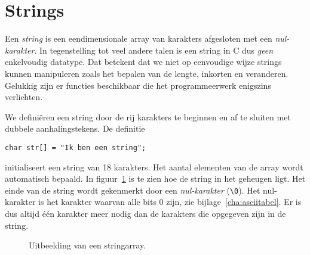 

\section{Strings}
Een \textsl{string} is een eendimensionale array van karakters afgesloten met een \textsl{nul-karakter}. In tegenstelling tot veel andere talen is een string in C dus \textsl{geen} enkelvoudig datatype. Dat betekent dat we niet op eenvoudige wijze strings kunnen manipuleren zoals het bepalen van de lengte, inkorten en veranderen. Gelukkig zijn er functies beschikbaar die het programmeerwerk enigszins verlichten. 

We definiëren een string door de rij karakters te beginnen en af te sluiten met dubbele aanhalingstekens. De definitie

\begin{lstlisting}[style=lstoneline]
char str[] = "Ik ben een string";
\end{lstlisting}

initialiseert een string van 18 karakters. Het aantal elementen van de array wordt automatisch bepaald.
In figuur~\ref{fig:arrastring} is te zien hoe de string in het geheugen ligt. Het einde van de string wordt gekenmerkt door een \textsl{nul-karakter} (\texttt{\textbackslash 0}). Het nul-karakter is het karakter waarvan alle bits 0 zijn, zie bijlage~\ref{cha:asciitabel}. Er is dus altijd één karakter meer nodig dan de karakters die opgegeven zijn in de string.

\begin{figure}[H]
\centering
{}
\caption{Uitbeelding van een stringarray.}
\label{fig:arrastring}
\end{figure}

